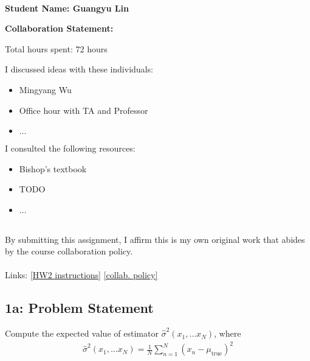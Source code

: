 \documentclass[10pt]{article}
\newcommand{\officialdirections}[1]{{\color{purple} #1}}
\begin{document}
~~\\ %

{\Large{\bf Student Name: Guangyu Lin}}

\Large{\bf Collaboration Statement:}

Total hours spent: 72 hours

I discussed ideas with these individuals:
\begin{itemize}
\item Mingyang Wu
\item Office hour with TA and Professor
\item $\ldots$	
\end{itemize}

I consulted the following resources:
\begin{itemize}
\item Bishop's textbook
\item TODO
\item $\ldots$	
\end{itemize}
~~\\
By submitting this assignment, I affirm this is my own original work that abides by the course collaboration policy.
~~\\
~~\\
Links: 
\href{https://www.cs.tufts.edu/cs/136/2023s/hw2.html}{[HW2 instructions]} 
\href{https://www.cs.tufts.edu/cs/136/2023s/index.html#collaboration}{[collab. policy]} 

\tableofcontents

\newpage

\officialdirections{
\subsection*{1a: Problem Statement}
Compute the expected value of estimator $\hat{\sigma}^2(x_1, \ldots x_N)$, where
\begin{align}
\hat{\sigma}^2(x_1, \ldots x_N) = \frac{1}{N} \sum_{n=1}^N (x_n - \mu_{\text{true}})^2
\end{align}
}
\end{document}
